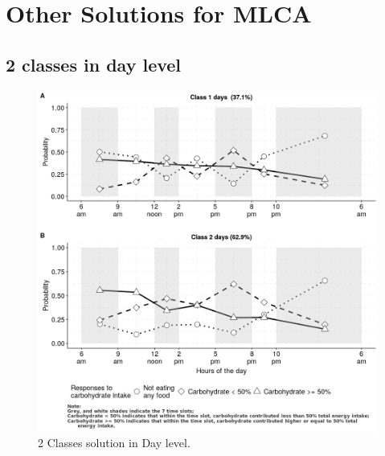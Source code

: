 
\chapter{Other Solutions for MLCA} %

\section{2 classes in day level}

\label{AppendixC} %

\begin{figure}[H]
	\centering
	\includegraphics{Figures/CW2level1.png}
	\decoRule
	\caption[2 Classes solution in Day level]{2 Classes solution in Day level.}
	\label{fig:CW2level1}
\end{figure}



